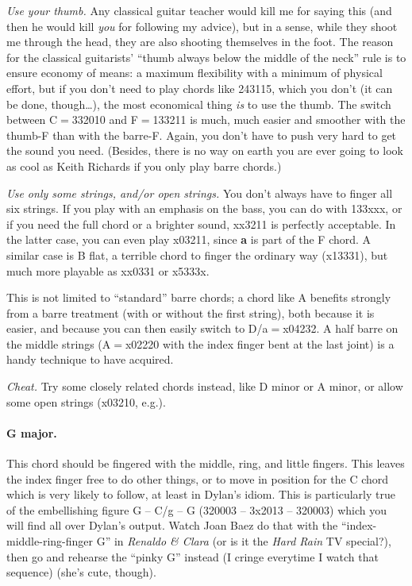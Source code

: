 \emph{Use your thumb.} Any classical guitar teacher would kill me for
saying this (and then he would kill \emph{you} for following my
advice), but in a sense, while they shoot me through the head, they
are also shooting themselves in the foot. The reason for the classical guitarists' ``{}thumb
always below the middle of the neck''{} rule is to ensure economy of means: a maximum
flexibility with a minimum of physical effort, but if you don't
need to play chords like 243115, which you don't (it can be done,
though\ldots{}), the most economical thing \emph{is} to use the
thumb. The switch between C$=$332010 and F$=$133211 is much, much easier
and smoother with the thumb-F than with the barre-F. Again, you don't
have to push very hard to get the sound you need. (Besides, there is
no way on earth you are ever going to look as cool as Keith Richards
if you only play barre chords.)

\emph{Use only some strings, and/or open strings.} You don't always
have to finger all six strings. If you play with an emphasis on the
bass, you can do with 133xxx, or if you need the full chord or a
brighter sound, xx3211 is perfectly acceptable. In the latter case,
you can even play x03211, since \textbf{a} is part of the F chord. A
similar case is B flat, a terrible chord to finger the ordinary way
(x13331), but much more playable as xx0331 or x5333x.

This is not limited to ``{}standard''{} barre chords; a chord like A
benefits strongly from a barre treatment (with or without the first
string), both because it is easier, and because you can then easily
switch to D/a$=$x04232. A half barre on the middle strings (A$=$x02220
with the index finger bent at the last joint) is a handy technique to
have acquired.

\emph{Cheat.} Try some closely related chords instead, like D minor or
A minor, or allow some open strings (x03210, e.g.).


\paragraph*{G major.} This chord should be fingered with the middle, ring,
and little fingers. This leaves the index finger free to do other
things, or to move in position for the C chord which is very likely to
follow, at least in Dylan's idiom. This is particularly true of the
embellishing figure G -- C/g -- G (320003 -- 3x2013 -- 320003) which
you will find all over Dylan's output. Watch Joan Baez do that with
the ``{}index-middle-ring-finger G''{} in \emph{Renaldo \& Clara }(or is it the
\emph{Hard Rain }TV special?), then go and rehearse the ``{}pinky
G''{} instead (I cringe everytime I watch that sequence) (she's cute, though).

